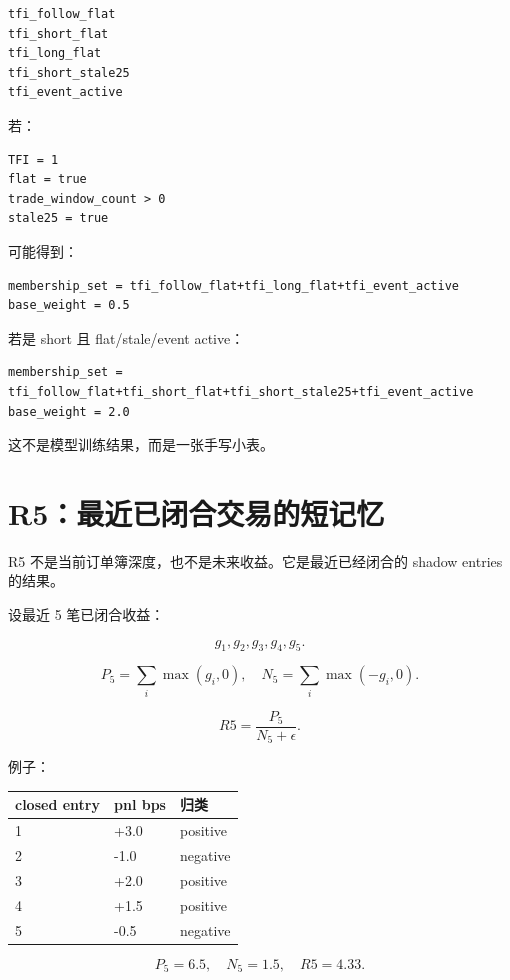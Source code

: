\begin{lstlisting}
tfi_follow_flat
tfi_short_flat
tfi_long_flat
tfi_short_stale25
tfi_event_active
\end{lstlisting}

若：

\begin{lstlisting}
TFI = 1
flat = true
trade_window_count > 0
stale25 = true
\end{lstlisting}

可能得到：

\begin{lstlisting}
membership_set = tfi_follow_flat+tfi_long_flat+tfi_event_active
base_weight = 0.5
\end{lstlisting}

若是 short 且 flat/stale/event active：

\begin{lstlisting}
membership_set = tfi_follow_flat+tfi_short_flat+tfi_short_stale25+tfi_event_active
base_weight = 2.0
\end{lstlisting}

这不是模型训练结果，而是一张手写小表。

\section{R5：最近已闭合交易的短记忆}

R5 不是当前订单簿深度，也不是未来收益。它是最近已经闭合的 shadow entries 的结果。

设最近 5 笔已闭合收益：

\[
g_1,g_2,g_3,g_4,g_5.
\]

\[
P_5=\sum_i \max(g_i,0),\quad N_5=\sum_i \max(-g_i,0).
\]

\[
R5=\frac{P_5}{N_5+\epsilon}.
\]

例子：

\begin{longtable}{p{}p{}p{}}
\toprule
closed entry & pnl bps & 归类 \\
\midrule
1 & +3.0 & positive \\
2 & -1.0 & negative \\
3 & +2.0 & positive \\
4 & +1.5 & positive \\
5 & -0.5 & negative \\
\bottomrule
\end{longtable}

\[
P_5=6.5,\quad N_5=1.5,\quad R5=4.33.
\]

